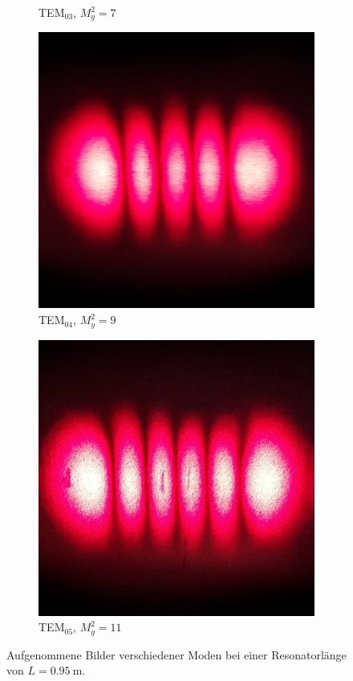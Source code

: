 \documentclass[a4paper,twoside,final]{article}
\begin{document}
\begin{figure}[ht!]
\begin{subfigure}[b!]{0.32\textwidth}
    \caption{TEM$_{03}$, $M_y^2 = 7$}
  \end{subfigure}
  \begin{subfigure}[b!]{0.32\textwidth}
    \includegraphics[width=\textwidth]{Bilder/TEM04_low.jpg}
    \caption{TEM$_{04}$, $M_y^2 = 9$}
  \end{subfigure}
  \begin{subfigure}[b!]{0.32\textwidth}
    \includegraphics[width=\textwidth]{Bilder/TEM05_low.jpg}
    \caption{TEM$_{05}$, $M_y^2 = 11$}
  \end{subfigure}
  \caption{Aufgenommene Bilder verschiedener Moden bei einer Resonatorlänge von $L = \SI{0.95}{\metre}$.}
  \label{fig:TransversaleModen}
\end{figure}
\FloatBarrier
\end{document}
